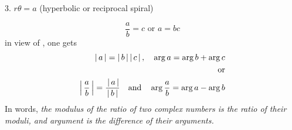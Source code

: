 \documentclass[11pt]{amsbook}
\begin{document}
%
3. $r \theta = a$ (hyperbolic or reciprocal spiral)



\[
	\frac{a}{b} = c \text{ or }  a = bc
\]
in view of , one gets
\begin{align}
	\label{eq:b1p331eq2}
	\hAbs{a} = \hAbs{b} \hAbs{c}, 
	\quad 
	\arg a = \arg b + \arg c\\
	\text{or}\\ %
	\hAbs{\frac{a}{b}} = \frac{{}\hAbs{a}}{\hAbs{b}} 
	\quad \text{and} 
	\quad
	 \arg \frac{a}{b} = \arg a - \arg  b
\end{align}
In words, 
\textit{
	the modulus of the ratio of two complex numbers is 
	the ratio of their moduli, and 
	argument is the difference of their arguments.
}
\end{document}
